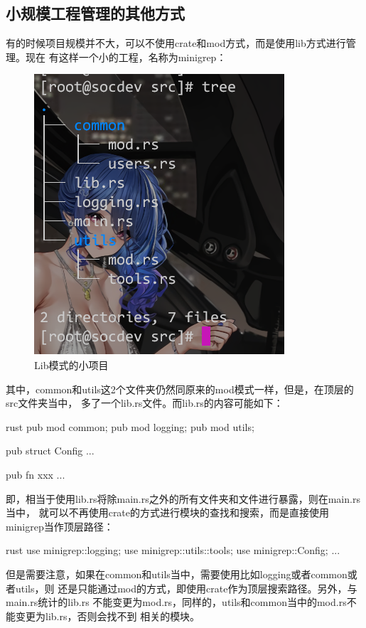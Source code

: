 \subsection{小规模工程管理的其他方式}
有的时候项目规模并不大，可以不使用crate和mod方式，而是使用lib方式进行管理。现在
有这样一个小的工程，名称为minigrep：
\begin{figure}[H]
  \centering
  \includegraphics[scale=0.4]{rust_lib_mod.png}
  \caption{Lib模式的小项目}
  \label{fig:rust_lib_mod}
\end{figure}
其中，common和utils这2个文件夹仍然同原来的mod模式一样，但是，在顶层的src文件夹当中，
多了一个lib.rs文件。而lib.rs的内容可能如下：
\begin{code-block}{rust}
pub mod common;
pub mod logging;
pub mod utils;

pub struct Config {
    ...
}

pub fn xxx {
   ...
}
\end{code-block}
即，相当于使用lib.rs将除main.rs之外的所有文件夹和文件进行暴露，则在main.rs当中，
就可以不再使用crate的方式进行模块的查找和搜索，而是直接使用minigrep当作顶层路径：
\begin{code-block}{rust}
use minigrep::logging;
use minigrep::utils::tools;
use minigrep::Config;
...
\end{code-block}

但是需要注意，如果在common和utils当中，需要使用比如logging或者common或者utils，则
还是只能通过mod的方式，即使用crate作为顶层搜索路径。另外，与main.rs统计的lib.rs
不能变更为mod.rs，同样的，utils和common当中的mod.rs不能变更为lib.rs，否则会找不到
相关的模块。

